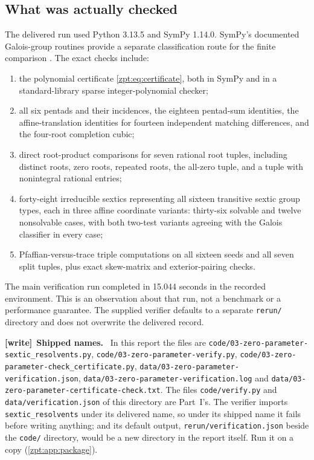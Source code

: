 \documentclass[11pt,letterpaper]{article}
\numberwithin{equation}{section}
\theoremstyle{definition}
\theoremstyle{remark}
\newcommand{\src}[1]{\texttt{\nolinkurl{#1}}}
\newcommand{\code}[1]{\texttt{\small #1}}
\newenvironment{writenote}[1][]{\par\smallskip\begingroup\small
 \noindent\textbf{[write]}\if\relax\detokenize{#1}\relax\else~\textbf{#1.}\fi\ }%
 {\par\endgroup\smallskip}
\begin{document}
\subsection{What was actually checked}
The delivered run used Python 3.13.5 and SymPy 1.14.0. SymPy's documented
Galois-group routines provide a separate classification route for the
finite comparison \cite{zpt:sympy-docs,tpo:sympy-tests}. The exact checks include:
\begin{enumerate}[itemsep=2pt]
\item the polynomial certificate \eqref{zpt:eq:certificate}, both in SymPy and
in a standard-library sparse integer-polynomial checker;
\item all six pentads and their incidences, the eighteen pentad-sum
identities, the affine-translation identities for fourteen independent
matching differences, and the four-root completion cubic;
\item direct root-product comparisons for seven rational root tuples,
including distinct roots, zero roots, repeated roots, the all-zero tuple,
and a tuple with nonintegral rational entries;
\item forty-eight irreducible sextics representing all sixteen transitive
sextic group types, each in three affine coordinate variants: thirty-six
solvable and twelve nonsolvable cases, with both two-test variants agreeing
with the Galois classifier in every case;
\item Pfaffian-versus-trace triple computations on all sixteen seeds and
all seven split tuples, plus exact skew-matrix and exterior-pairing checks.
\end{enumerate}
The main verification run completed in 15.044 seconds in the recorded
environment. This is an observation about that run, not a benchmark or a
performance guarantee. The supplied verifier defaults to a separate
\code{rerun/} directory and does not overwrite the delivered record.

\begin{writenote}[Shipped names]
In this report the files are \src{code/03-zero-parameter-sextic_resolvents.py},
\src{code/03-zero-parameter-verify.py},
\src{code/03-zero-parameter-check_certificate.py},
\src{data/03-zero-parameter-verification.json},
\src{data/03-zero-parameter-verification.log} and
\src{data/03-zero-parameter-certificate-check.txt}. The files
\src{code/verify.py} and \src{data/verification.json} of this directory are
Part~I's. The verifier imports \src{sextic_resolvents} under its delivered
name, so under its shipped name it fails before writing anything; and its
default output, \src{rerun/verification.json} beside the \src{code/}
directory, would be a new directory in the report itself. Run it on a copy
(\cref{zpt:app:package}).
\end{writenote}
\end{document}
